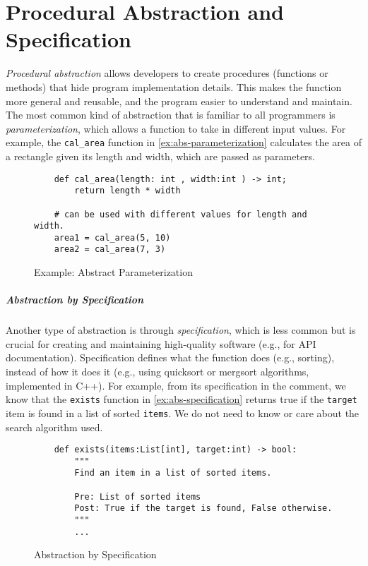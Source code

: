 \documentclass[oneside,11pt,dvipsnames]{book}
\newcommand{\code}[1]{\texttt{#1}}
\begin{document}
\chapter{Procedural Abstraction and Specification}\label{chap:procedural-abstraction}

\emph{Procedural abstraction} allows developers to create procedures (functions or methods) that hide program implementation details. This makes the function more general and reusable, and the program easier to understand and maintain. The most common kind of abstraction that is familiar to all programmers is \emph{parameterization}, which allows a function to take in different input values. For example, the \code{cal\_area} function in \autoref{ex:abs-parameterization} calculates the area of a rectangle given its length and width, which are passed as parameters.


\begin{figure}[h]
    \begin{lstlisting}
    def cal_area(length: int , width:int ) -> int;
        return length * width

    # can be used with different values for length and width.
    area1 = cal_area(5, 10)
    area2 = cal_area(7, 3)
\end{lstlisting}
\caption{Example: Abstract Parameterization}\label{ex:abs-parameterization}
\end{figure}

\paragraph{Abstraction by Specification} 
Another type of abstraction is through \emph{specification}, which is less common but is crucial for creating and maintaining high-quality software (e.g., for API documentation). Specification defines what the function does (e.g., sorting), instead of how it does it (e.g., using quicksort or mergsort algorithms, implemented in C++). For example, from its specification in the comment, we know that the \code{exists} function in \autoref{ex:abs-specification} returns true if the \code{target} item is found in a list of sorted \code{items}. We do not need to know or care about the search algorithm used.
\begin{figure}
\begin{lstlisting}
    def exists(items:List[int], target:int) -> bool:
        """
        Find an item in a list of sorted items.

        Pre: List of sorted items
        Post: True if the target is found, False otherwise.
        """
        ...
\end{lstlisting}
\caption{Abstraction by Specification}\label{ex:abs-specification}
\end{figure}
\end{document}

